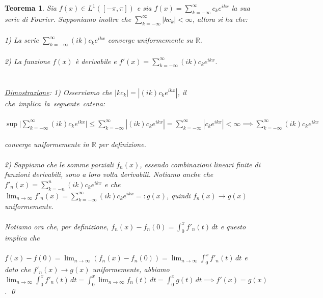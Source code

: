 \documentclass[a4paper,12pt]{report}
\newtheorem{teorema}{Teorema}[chapter]
\newcommand{\lt}{<}
\begin{document}
\begin{teorema}
    Sia $f(x)\in L^1([-\pi,\pi])$ e sia $\displaystyle f(x)=\sum_{k=-\infty}^\infty c_ke^{ikx}$ la sua serie di Fourier. Supponiamo inoltre che $\displaystyle\sum_{k=-\infty}^\infty|kc_k|\lt\infty$, allora si ha che:
    \\
    \\ 1) La serie $\displaystyle\sum_{k=-\infty}^\infty(ik)c_ke^{ikx}$ converge uniformemente su $\mathbb{R}$.
    \\
    \\ 2) La funzione $f(x)$ è derivabile e $f'(x)=\displaystyle\sum_{k=-\infty}^\infty(ik)c_ke^{ikx}$.
    \\
    \\ 
    \\\underline{Dimostrazione}: 1) Osserviamo che $|kc_k|=|(ik)c_ke^{ikx}|$, il \mbox{che implica la seguente catena}:
    \\
    \\$\sup \displaystyle\bigg|\sum_{k=-\infty}^\infty (ik)c_ke^{ikx}\bigg|\leq\sum_{k=-\infty}^\infty|(ik)c_ke^{ikx}|=\sum_{k=-\infty}^\infty |c_ke^{ikx}|\lt\infty\implies \sum_{k=-\infty}^\infty(ik)c_ke^{ikx}$
    \\
    \\converge uniformemente in $\mathbb{R}$ per definizione.
    \\
    \\ 2) Sappiamo che le somme parziali $f_n(x)$, essendo combinazioni lineari finite di funzioni derivabili, sono a loro volta derivabili. Notiamo anche che $\displaystyle f'_n(x)=\sum_{k=-n}^n(ik)c_ke^{ikx}$ e che $\displaystyle\lim_{n\to\infty}f'_n(x)=\sum_{k=-\infty}^\infty(ik)c_ke^{ikx}=:g(x)$, quindi $f_n(x)\to g(x)$ uniformemente.
    \\
    \\ Notiamo ora che, per definizione, $f_n(x)-f_n(0)=\displaystyle\int_0^xf'_n(t)\,dt$ e questo implica che
    \\
    \\ $\displaystyle f(x)-f(0)=\lim_{n\to\infty}(f_n(x)-f_n(0))=\lim_{n\to\infty}\int_0^x f'_n(t)\,dt$ e dato che $f'_n(x)\to g(x)$ uniformemente, abbiamo \mbox{$\displaystyle\lim_{n\to\infty}\int_0^x f'_n(t)\,dt=\int_0^x\lim_{n\to\infty}f_n(t)\,dt=\int_0^xg(t)\,dt \implies f'(x)=g(x)$.} \qed  
\end{teorema}

\newpage
\end{document}
